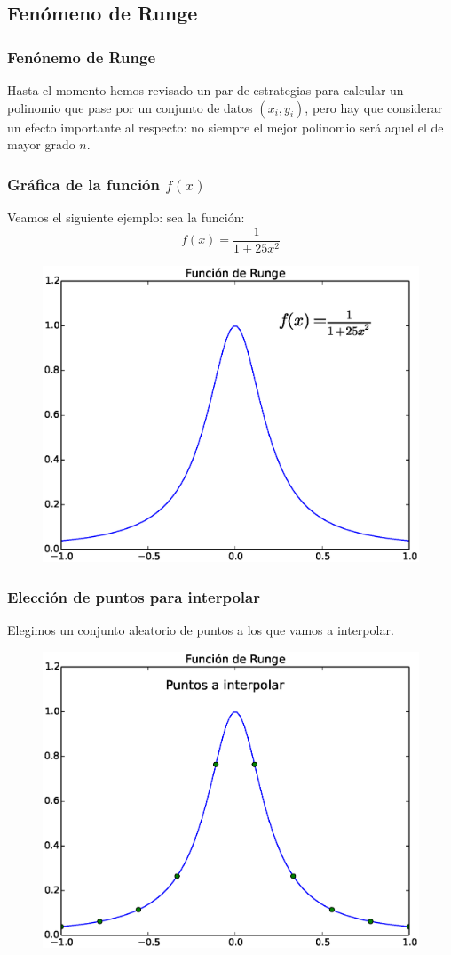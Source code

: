 {\subsection{Fenómeno de Runge}
\begin{frame}
\frametitle{Fenónemo de Runge}
Hasta el momento hemos revisado un par de estrategias para calcular un polinomio que pase por un conjunto de datos $(x_{i}, y_{i})$, pero hay que considerar un efecto importante al respecto: no siempre el mejor polinomio será aquel el de mayor grado $n$.
\end{frame}
\begin{frame}
\frametitle{Gráfica de la función $f(x)$}
Veamos el siguiente ejemplo: sea la función:
\[ f(x) = \dfrac{1}{1 + 25 x^{2}}\]
\begin{figure}
    \centering
    \includegraphics[scale=0.35]{Imagenes/Funcion_Runge_01.eps} 
\end{figure}
\end{frame}
\begin{frame}
\frametitle{Elección de puntos para interpolar}
Elegimos un conjunto aleatorio de puntos a los que vamos a interpolar.
\begin{figure}
    \centering
    \includegraphics[scale=0.4]{Imagenes/Funcion_Runge_02.eps} 

\end{figure}
\end{frame}}
